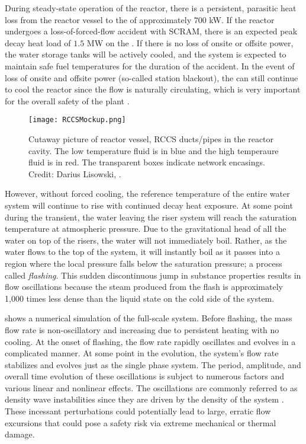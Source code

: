 During steady-state operation of the reactor, there is a persistent, parasitic heat loss from the reactor vessel to the  of approximately $700$ kW.
If the reactor undergoes a loss-of-forced-flow accident with SCRAM, there is an expected peak decay heat load of $1.5$ MW on the .
If there is no loss of onsite or offsite power, the  water storage tanks will be actively cooled, and the system is expected to maintain safe fuel temperatures for the duration of the accident.
In the event of loss of onsite and offsite power (so-called station blackout), the  can still continue to cool the reactor since the flow is naturally circulating, which is very important for the overall safety of the plant \cite[]{nuclearregulatorycomminission_us_2007}.

\begin{figure}%
\centering
    \caption[RCCS near-reactor-riser system]{   Cutaway picture of reactor vessel, RCCS ducts/pipes in the reactor cavity.  
                The low temperature fluid is in blue and the high temperaure fluid is in red.  
                The transparent boxes indicate network encasings. 
                Credit: Darius Lisowski, \TheUniversity.}%
    \label{Figure:RCCSMockup}%
    \texttt{[image: RCCSMockup.png]}%
\end{figure}

However, without forced cooling, the reference temperature of the entire water system will continue to rise with continued decay heat exposure.
At some point during the transient, the water leaving the riser system will reach the saturation temperature at atmospheric pressure.  
Due to the gravitational head of all the water on top of the risers, the water will not immediately boil.
Rather, as the water flows to the top of the system, it will instantly boil as it passes into a region where the local pressure falls below the saturation pressure; a process called \textit{flashing}.
This sudden discontinuous jump in substance properties results in flow oscillations because the steam produced from the flash is approximately 1,000 times less dense than the liquid state on the cold side of the system.

 shows a numerical simulation of the full-scale system.
Before flashing, the mass flow rate is non-oscillatory and increasing due to persistent heating with no cooling.
At the onset of flashing, the flow rate rapidly oscillates and evolves in a complicated manner.
At some point in the evolution, the system's flow rate stabilizes and evolves just as the single phase system.
The period, amplitude, and overall time evolution of these oscillations is subject to numerous factors and various linear and nonlinear effects.
The oscillations are commonly referred to as density wave instabilities since they are driven by the density of the system \cite{achard_analysis_1985}.
These incessant perturbations could potentially lead to large, erratic flow excursions that could pose a safety risk via extreme mechanical or thermal damage.

